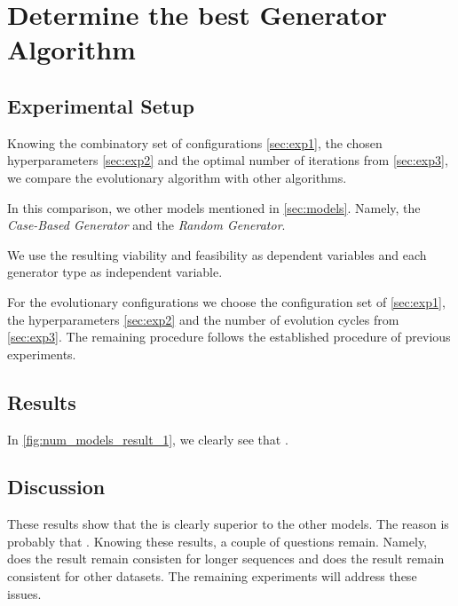 \documentclass[./../../paper.tex]{subfiles}
\begin{document}
\section{Determine the best Generator Algorithm}

\subsection{Experimental Setup}
Knowing the combinatory set of configurations \autoref{sec:exp1}, the chosen hyperparameters \autoref{sec:exp2} and the optimal number of iterations from \autoref{sec:exp3}, we compare the evolutionary algorithm with other algorithms. 

In this comparison, we other models mentioned in \autoref{sec:models}. Namely, the \emph{Case-Based Generator} and the \emph{Random Generator}. 

We use the resulting viability and feasibility as dependent variables and each generator type as independent variable.

For the evolutionary configurations we choose the configuration set of \autoref{sec:exp1}, the hyperparameters \autoref{sec:exp2} and the number of evolution cycles from \autoref{sec:exp3}. The remaining procedure follows the established procedure of previous experiments.

\subsection{Results}




In \autoref{fig:num_models_result_1}, we clearly see that . 

\subsection{Discussion}
These results show that the  is clearly superior to the other models. The reason is probably that . Knowing these results, a couple of questions remain. Namely, does the result remain consisten for longer sequences and does the result remain consistent for other datasets.  The remaining experiments will address these issues. 
\end{document}
